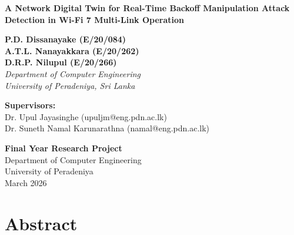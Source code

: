 \documentclass[12pt,a4paper]{article}
\begin{document}
\begin{titlepage}
\centering
\vspace*{2cm}

{\LARGE\bfseries A Network Digital Twin for Real-Time Backoff Manipulation Attack Detection in Wi-Fi 7 Multi-Link Operation\par}

\vspace{2cm}

{\large
\textbf{P.D. Dissanayake (E/20/084)}\\
\textbf{A.T.L. Nanayakkara (E/20/262)}\\
\textbf{D.R.P. Nilupul (E/20/266)}\\[0.5cm]
\textit{Department of Computer Engineering}\\
\textit{University of Peradeniya, Sri Lanka}
\par}

\vspace{2cm}

{\large
\textbf{Supervisors:}\\
Dr. Upul Jayasinghe (upuljm@eng.pdn.ac.lk)\\
Dr. Suneth Namal Karunarathna (namal@eng.pdn.ac.lk)
\par}

\vspace{3cm}

{\large
\textbf{Final Year Research Project}\\
Department of Computer Engineering\\
University of Peradeniya\\[0.5cm]
March 2026
\par}

\end{titlepage}

\newpage
\section*{Abstract}
\end{document}
